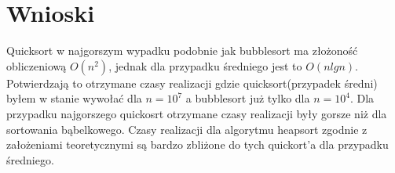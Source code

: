 \documentclass[a4paper,11pt]{report}
\begin{document}
\section{Wnioski}
Quicksort w najgorszym wypadku podobnie jak bubblesort ma złożoność obliczeniową $O(n^{2})$, jednak dla przypadku średniego jest to $O(n lgn)$. Potwierdzają to otrzymane czasy realizacji gdzie quicksort(przypadek średni) byłem w stanie wywołać dla $n=10^{7}$ a bubblesort już tylko dla $n=10^{4}$. Dla przypadku najgorszego quickosrt otrzymane czasy realizacji były gorsze niż dla sortowania bąbelkowego. Czasy realizacji dla algorytmu heapsort zgodnie z założeniami teoretycznymi są bardzo zbliżone do tych quickort'a dla przypadku średniego.
\end{document}
